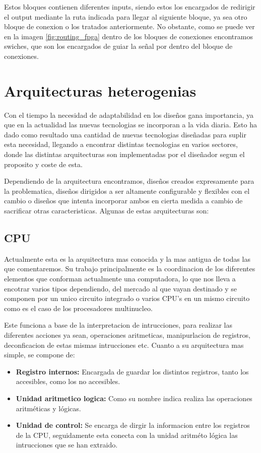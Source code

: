 \documentclass[11pt,spanish,listoffigures,listoftables]{tfgetsinf}
\begin{document}
      Estos bloques contienen diferentes inputs, siendo estos los encargados de
      redirigir el output mediante la ruta indicada para llegar al siguiente
      bloque, ya sea otro bloque de conexion o los tratados anteriormente. No
      obstante, como se puede ver en la imagen \ref{fig:routing_fpga} dentro de
      los bloques de conexiones encontramos swiches, que son los encargados de
      guiar la señal por dentro del bloque de conexiones.

\section{Arquitecturas heterogenias}
   Con el tiempo la necesidad de adaptabilidad en los diseños gana importancia,
   ya que en la actualidad las nuevas tecnologias se incorporan a la vida
   diaria.  Esto ha dado como resultado una cantidad de nuevas tecnologias
   diseñadas para suplir esta necesidad, llegando a encontrar distintas
   tecnologias en varios sectores, donde las distintas arquitecturas son
   implementadas por el diseñador segun el proposito y coste de esta.  

   Dependiendo de la arquitectura encontramos, diseños creados expresamente para
   la problematica, diseños dirigidos a ser altamente configurable y flexibles
   con el cambio o diseños que intenta incorporar ambos en cierta medida a
   cambio de sacrificar otras caracteristicas. Algunas de estas arquitecturas
   son:

   \subsection{CPU}
      Actualmente esta es la arquitectura mas conocida y la mas antigua de todas
      las que comentaremos. Su trabajo principalmente es la coordinacion de los
      diferentes elementos que conforman actualmente una computadora, lo que nos
      lleva a encotrar varios tipos dependiendo, del mercado al que vayan
      destinado y se componen por un unico circuito integrado o varios CPU's en
      un mismo circuito como es el caso de los procesadores multinucleo.

      Este funciona a base de la interpretacion de intrucciones, para realizar
      las diferentes acciones ya sean, operaciones aritmeticas, manipurlacion de
      registros, deconficacion de estas mismas intrucciones etc. Cuanto a su
      arquitectura mas simple, se compone de:
      
      \begin{itemize}
         \item \textbf{Registro internos:} Encargada de guardar los distintos registros,
         tanto los accesibles, como los no accesibles.
         \item \textbf{Unidad aritmetico logica:} Como su nombre indica realiza las
         operaciones aritméticas y lógicas.
         \item \textbf{Unidad de control:} Se encarga de dirgir la informacion entre los
         registros de la CPU, seguidamente esta conecta con la unidad aritméto
         lógica las intrucciones que se han extraido.
      \end{itemize}
\end{document}
